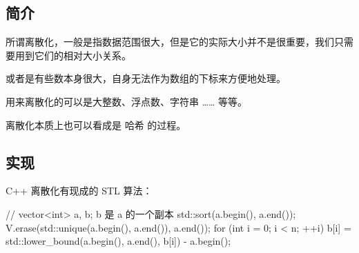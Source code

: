 
\subsection{简介}

所谓离散化，一般是指数据范围很大，但是它的实际大小并不是很重要，我们只需要用到它们的相对大小关系。

或者是有些数本身很大，自身无法作为数组的下标来方便地处理。

用来离散化的可以是大整数、浮点数、字符串 …… 等等。

离散化本质上也可以看成是  哈希  的过程。

\subsection{实现}

C++ 离散化有现成的 STL 算法：

\begin{cppcode}
// vector<int> a, b; b 是 a 的一个副本
std::sort(a.begin(), a.end());
V.erase(std::unique(a.begin(), a.end()), a.end());
for (int i = 0; i < n; ++i)
  b[i] = std::lower_bound(a.begin(), a.end(), b[i]) - a.begin();
\end{cppcode}
